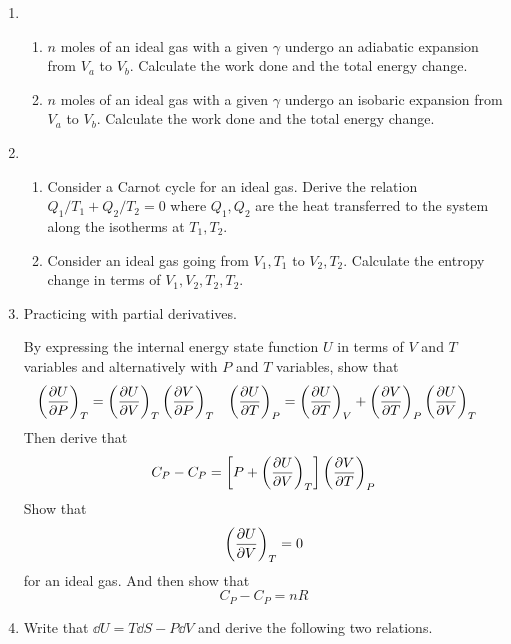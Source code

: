 \documentclass[../psets.tex]{subfiles}
\begin{document}
\begin{enumerate}
\begin{center}
    \end{center}
    \item 
    \begin{enumerate}
        \item $n$ moles of an ideal gas with a given $\gamma$ undergo an adiabatic expansion from $V_a$ to $V_b$. Calculate the work done and the total energy change.
        \item $n$ moles of an ideal gas with a given $\gamma$ undergo an isobaric expansion from $V_a$ to $V_b$. Calculate the work done and the total energy change.
    \end{enumerate}
    \item 
    \begin{enumerate}
        \item Consider a Carnot cycle for an ideal gas. Derive the relation $Q_1/T_1+Q_2/T_2=0$ where $Q_1,Q_2$ are the heat transferred to the system along the isotherms at $T_1,T_2$.
        \item Consider an ideal gas going from $V_1,T_1$ to $V_2,T_2$. Calculate the entropy change in terms of $V_1,V_2,T_2,T_2$.
    \end{enumerate}
    \item Practicing with partial derivatives.\par
    By expressing the internal energy state function $U$ in terms of $V$ and $T$ variables and alternatively with $P$ and $T$ variables, show that
    \begin{align*}
        \left( \pdv{U}{P} \right)_T &= \left( \pdv{U}{V} \right)_T\left( \pdv{V}{P} \right)_T&
        \left( \pdv{U}{T} \right)_P &= \left( \pdv{U}{T} \right)_V+\left( \pdv{V}{T} \right)_P\left( \pdv{U}{V} \right)_T
    \end{align*}
    Then derive that
    \begin{equation*}
        C_P-C_P = \left[ P+\left( \pdv{U}{V} \right)_T \right]\left( \pdv{V}{T} \right)_P
    \end{equation*}
    Show that
    \begin{equation*}
        \left( \pdv{U}{V} \right)_T = 0
    \end{equation*}
    for an ideal gas. And then show that
    \begin{equation*}
        C_P-C_P = nR
    \end{equation*}
    \item Write that $\dd{U}=T\dd{S}-P\dd{V}$ and derive the following two relations.

\end{enumerate}
\end{document}
